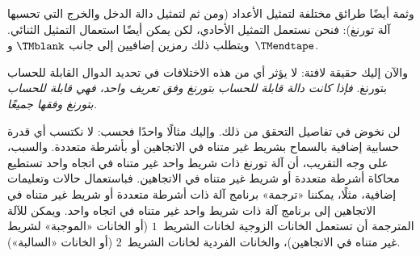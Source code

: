 \documentclass[../../../include/open-logic-section]{subfiles}
\begin{document}
وثمة أيضًا طرائق مختلفة لتمثيل الأعداد (ومن ثم لتمثيل دالة الدخل
والخرج التي تحسبها آلة تورنغ): فنحن نستعمل التمثيل الأحادي، لكن يمكن
أيضًا استعمال التمثيل الثنائي. ويتطلب ذلك رمزين إضافيين إلى جانب
$\TMblank$ و~$\TMendtape$.

والآن إليك حقيقة لافتة: لا يؤثر أي من هذه الاختلافات في تحديد الدوال
القابلة للحساب بتورنغ. \emph{فإذا كانت دالة قابلة للحساب بتورنغ وفق
تعريف واحد، فهي قابلة للحساب بتورنغ وفقها جميعًا.}

لن نخوض في تفاصيل التحقق من ذلك. وإليك مثالًا واحدًا فحسب: لا نكتسب
أي قدرة حسابية إضافية بالسماح بشريط غير متناه في الاتجاهين أو بأشرطة
متعددة. والسبب، على وجه التقريب، أن آلة تورنغ ذات شريط واحد غير متناه
في اتجاه واحد تستطيع محاكاة أشرطة متعددة أو شريط غير متناه في
الاتجاهين. فباستعمال حالات وتعليمات إضافية، مثلًا، يمكننا «ترجمة»
برنامج آلة ذات أشرطة متعددة أو شريط غير متناه في الاتجاهين إلى برنامج
آلة ذات شريط واحد غير متناه في اتجاه واحد. ويمكن للآلة المترجمة أن
تستعمل الخانات الزوجية لخانات الشريط~$1$ (أو الخانات «الموجبة» لشريط
غير متناه في الاتجاهين)، والخانات الفردية لخانات الشريط~$2$ (أو
الخانات «السالبة»).
\end{document}
